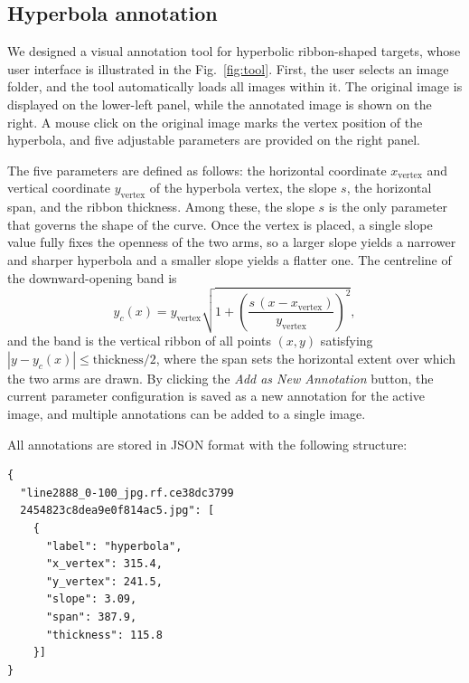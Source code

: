 \documentclass[lettersize,journal]{IEEEtran}
\begin{document}
\subsection{Hyperbola annotation}
We designed a visual annotation tool for hyperbolic ribbon-shaped targets, whose user interface is illustrated in the Fig.~\ref{fig:tool}.
First, the user selects an image folder, and the tool automatically loads all images within it.
The original image is displayed on the lower-left panel, while the annotated image is shown on the right.
A mouse click on the original image marks the vertex position of the hyperbola, and five adjustable parameters are provided on the right panel.

The five parameters are defined as follows: the horizontal coordinate $x_{\mathrm{vertex}}$ and 
vertical coordinate $y_{\mathrm{vertex}}$ of the hyperbola vertex, the slope $s$, the horizontal span, and the ribbon thickness.
Among these, the slope $s$ is the only parameter that governs the shape of the curve. 
Once the vertex is placed, a single slope value fully fixes the openness of the two arms, 
so a larger slope yields a narrower and sharper hyperbola and a smaller slope yields a flatter one.
The centreline of the downward-opening band is
\begin{equation}
y_c(x) = y_{\mathrm{vertex}}\sqrt{1 + \left(\frac{s\,(x - x_{\mathrm{vertex}})}{y_{\mathrm{vertex}}}\right)^2},
\end{equation}
and the band is the vertical ribbon of all points $(x,y)$ satisfying $|y - y_c(x)| \le \mathrm{thickness}/2$, 
where the span sets the horizontal extent over which the two arms are drawn.
By clicking the \emph{Add as New Annotation} button, 
the current parameter configuration is saved as a new annotation for the active image, 
and multiple annotations can be added to a single image.

All annotations are stored in JSON format with the following structure:
\begin{verbatim}
{
  "line2888_0-100_jpg.rf.ce38dc3799
  2454823c8dea9e0f814ac5.jpg": [
    {
      "label": "hyperbola",
      "x_vertex": 315.4,
      "y_vertex": 241.5,
      "slope": 3.09,
      "span": 387.9,
      "thickness": 115.8
    }]
}
\end{verbatim}
\end{document}
